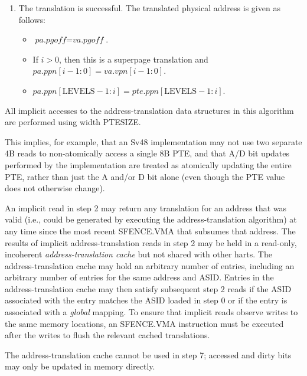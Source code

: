 \begin{enumerate}
\item The translation is successful. The translated physical address is
  given as follows:
\begin{itemize}
\item $\textit{pa.pgoff} = \textit{va.pgoff}$.
\item If $i>0$, then this is a superpage translation and $pa.ppn[i-1:0]=va.vpn[i-1:0]$.
\item $pa.ppn[\textrm{LEVELS} - 1:i] = pte.ppn[\textrm{LEVELS} - 1:i]$.
\end{itemize}

\end{enumerate}

All implicit accesses to the address-translation data structures in this
algorithm are performed using width PTESIZE.

\begin{commentary}
This implies, for example, that an Sv48 implementation may not use two separate
4B reads to non-atomically access a single 8B PTE, and that A/D bit updates
performed by the implementation are treated as atomically updating the entire
PTE, rather than just the A and/or D bit alone (even though the PTE value does
not otherwise change).
\end{commentary}

An implicit read in step 2 may return any translation for an address that was
valid (i.e., could be generated by executing the address-translation algorithm)
at any time since the most recent SFENCE.VMA that subsumes that address.
The results of implicit address-translation reads in step 2 may be held in a
read-only, incoherent {\em address-translation cache} but not shared with other
harts.  The address-translation cache may hold an arbitrary number of entries,
including an arbitrary number of entries for the same address and ASID.
Entries in the address-translation cache may then satisfy subsequent step 2
reads if the ASID associated with the entry matches the ASID loaded in step 0
or if the entry is associated with a {\em global} mapping.  To ensure that
implicit reads observe writes to the same memory locations, an SFENCE.VMA
instruction must be executed after the writes to flush the relevant cached
translations.

The address-translation cache cannot be used in step 7; accessed and
dirty bits may only be updated in memory directly.

